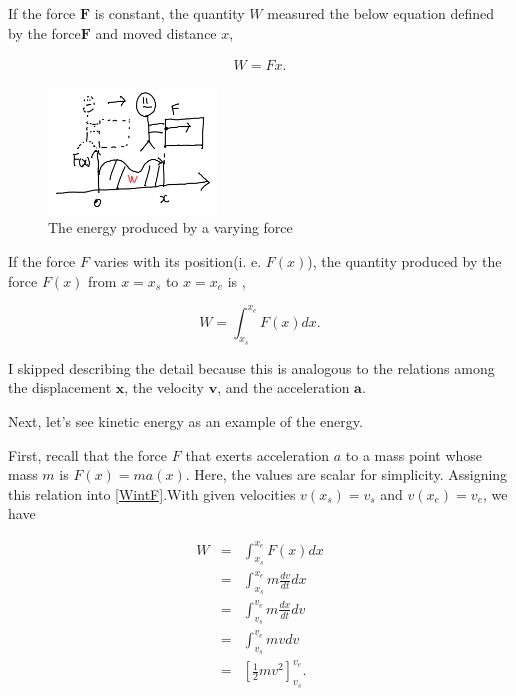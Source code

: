 \documentclass[pdflatex,sn-mathphys-num]{sn-jnl}%
\theoremstyle{thmstyleone}%
\theoremstyle{thmstyletwo}%
\theoremstyle{thmstylethree}%
\begin{document}
If the force $\boldsymbol{F}$ is constant, the quantity $W$ measured the below equation defined by the force$\boldsymbol{F}$ and moved distance $x$,

\begin{eqnarray}
	W = Fx.
\end{eqnarray}

\begin{figure}[H]
	\centering
	\includegraphics[width=0.4\textwidth]{images/ununiformForceEnergy.png}
	\caption{The energy produced by a varying force}
	\label{ununiformForceEnergy}
\end{figure}

If the force $F$ varies with its position(i. e. $F(x)$), the quantity produced by the force $F(x)$ from $x = x_s$ to $x = x_e$ is ,

\begin{equation}
	W = \int_{x_s}^{x_e}F(x) dx.\label{WintF}
\end{equation}

I skipped describing the detail because this is analogous to the relations among the displacement $\boldsymbol{x}$, the velocity $\boldsymbol{v}$, and the acceleration $\boldsymbol{a}$.

Next, let's see kinetic energy as an example of the energy.

First, recall that the force $F$ that exerts acceleration $a$ to a mass point whose mass $m$ is $F(x) = ma(x)$. Here, the values are scalar for simplicity.
Assigning this relation into \ref{WintF}.With given velocities $v(x_s) = v_s$ and $v(x_e) = v_e$, we have 

\begin{eqnarray}
		W &=& \int_{x_s}^{x_e}F(x) dx\\
		  &=& \int_{x_s}^{x_e}m\frac{dv}{dt}dx\\
		  &=& \int_{v_s}^{v_e}m\frac{dx}{dt}dv\\
		  &=&\int_{v_s}^{v_e}m vdv\\
		  &=&\left[\frac{1}{2}m v^2\right]_{v_s}^{v_e}.
\end{eqnarray}
\end{document}
